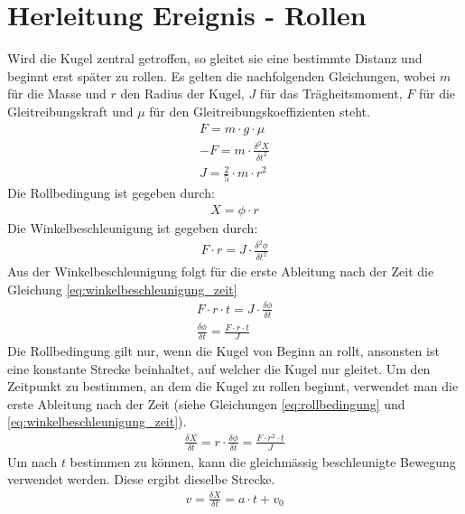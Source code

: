 \section{Herleitung Ereignis - Rollen}\label{anhang:herleitung:event:rollen}
Wird die Kugel zentral getroffen, so gleitet sie eine bestimmte Distanz und beginnt erst später zu rollen\cite{rollzeitpunkt}.
Es gelten die nachfolgenden Gleichungen, wobei $m$ für die Masse und $r$ den Radius der Kugel, $J$ für das
Trägheitsmoment, $F$ für die Gleitreibungskraft und $\mu$ für den Gleitreibungskoeffizienten steht.
\begin{align}
    F = m \cdot g \cdot \mu\\
    -F = m \cdot \frac{\delta^2 X}{\delta t^2}\\
    J = \frac{2}{5} \cdot m \cdot r^2
\end{align}
Die Rollbedingung ist gegeben durch:
\begin{align}
    X = \phi \cdot r\label{eq:rollbedingung}
\end{align}
Die Winkelbeschleunigung ist gegeben durch:
\begin{align}
    F \cdot r = J \cdot \frac{\delta^2 \phi}{\delta t^2}
\end{align}
Aus der Winkelbeschleunigung folgt für die erste Ableitung nach der Zeit die Gleichung \ref{eq:winkelbeschleunigung_zeit}
\begin{align}
    F \cdot r \cdot t = J \cdot \frac{\delta \phi}{\delta t}\\
    \frac{\delta \phi}{\delta t} = \frac{F \cdot r \cdot t}{J}\label{eq:winkelbeschleunigung_zeit}
\end{align}
Die Rollbedingung gilt nur, wenn die Kugel von Beginn an rollt, ansonsten ist eine konstante Strecke beinhaltet,
auf welcher die Kugel nur gleitet\cite{rollzeitpunkt}. Um den Zeitpunkt zu bestimmen, an dem die Kugel zu rollen
beginnt, verwendet man die erste Ableitung nach der Zeit (siehe Gleichungen \ref{eq:rollbedingung} und \ref{eq:winkelbeschleunigung_zeit}).
\begin{align}
    \frac{\delta X}{\delta t} = r \cdot \frac{\delta \phi}{\delta t} = \frac{F \cdot r^2 \cdot t}{J}\label{eq:ableitung_winkelbeschleunigung_zeit}
\end{align}
Um nach $t$ bestimmen zu können, kann die gleichmässig beschleunigte Bewegung verwendet werden. Diese ergibt dieselbe
Strecke.
\begin{align}
    v = \frac{\delta X}{\delta t} = a \cdot t + v_0
\end{align}
